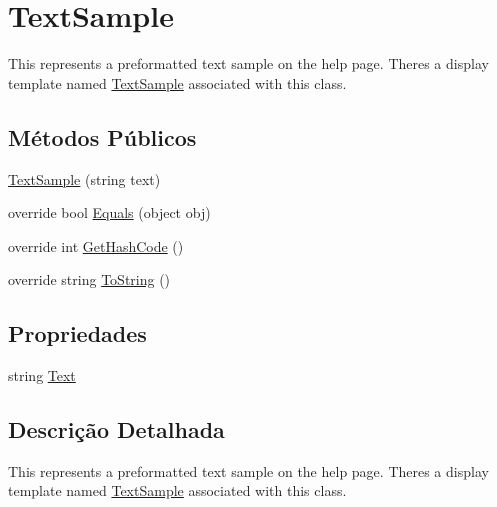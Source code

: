 \hypertarget{classApi3Layers_1_1Areas_1_1HelpPage_1_1TextSample}{}\section{Text\+Sample}
\label{classApi3Layers_1_1Areas_1_1HelpPage_1_1TextSample}


This represents a preformatted text sample on the help page. There\textquotesingle{}s a display template named \hyperlink{classApi3Layers_1_1Areas_1_1HelpPage_1_1TextSample}{Text\+Sample} associated with this class.  


\subsection*{Métodos Públicos}
\begin{DoxyCompactItemize}
\item 
\hyperlink{classApi3Layers_1_1Areas_1_1HelpPage_1_1TextSample_a0e2073a697196a2cf0fe4b5c7ea26434}{Text\+Sample} (string text)
\item 
override bool \hyperlink{classApi3Layers_1_1Areas_1_1HelpPage_1_1TextSample_aadf763f0213fc2f3875230b06bb0b6cf}{Equals} (object obj)
\item 
override int \hyperlink{classApi3Layers_1_1Areas_1_1HelpPage_1_1TextSample_a77e1afa2b6dee1ed3640da81d7407b42}{Get\+Hash\+Code} ()
\item 
override string \hyperlink{classApi3Layers_1_1Areas_1_1HelpPage_1_1TextSample_aa73e7c4dd1df5fd5fbf81c7764ee1533}{To\+String} ()
\end{DoxyCompactItemize}
\subsection*{Propriedades}
\begin{DoxyCompactItemize}
\item 
string \hyperlink{classApi3Layers_1_1Areas_1_1HelpPage_1_1TextSample_ab4726c7c06ae41233e679361293b4173}{Text}
\end{DoxyCompactItemize}


\subsection{Descrição Detalhada}
This represents a preformatted text sample on the help page. There\textquotesingle{}s a display template named \hyperlink{classApi3Layers_1_1Areas_1_1HelpPage_1_1TextSample}{Text\+Sample} associated with this class. 




